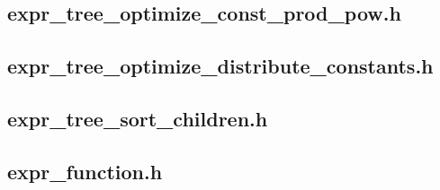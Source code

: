 \documentclass{article}
\begin{document}
\subsection{expr\_tree\_optimize\_const\_prod\_pow.h} \nopagebreak
\subsection{expr\_tree\_optimize\_distribute\_constants.h} \nopagebreak
\subsection{expr\_tree\_sort\_children.h} \nopagebreak
\subsection{expr\_function.h} \nopagebreak
\end{document}
